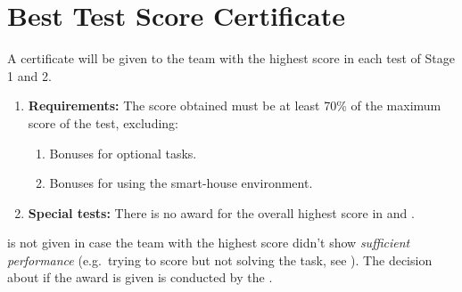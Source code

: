 \section{Best Test Score Certificate}\label{sec:best_score_certificate}
A certificate will be given to the team with the highest score in each test of Stage 1 and 2. 

\begin{enumerate}
	\item \textbf{Requirements:} The score obtained must be at least 70\% of the maximum score of the test, excluding:
	\begin{enumerate}
		\item Bonuses for optional tasks.
		\item Bonuses for using the smart-house environment.
	\end{enumerate}
	\item \textbf{Special tests:} There is no award for the overall highest score in  and .
\end{enumerate}

 is not given in case the team with the highest score didn't show \emph{sufficient performance} (e.g.~trying to score but not solving the task, see ). The decision about if the award is given is conducted by the .


